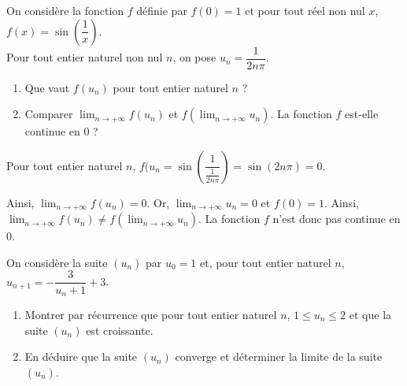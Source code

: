 \documentclass[11pt,fleqn, openany]{book} %
\begin{document}
\begin{exercise}On considère la fonction $f$ définie par $f(0)=1$ et pour tout réel non nul $x$, $f(x)=\sin\left(\dfrac{1}{x}\right)$. \\ Pour tout entier naturel non nul $n$, on pose $u_n=\dfrac{1}{2n\pi}$.
\begin{enumerate}
\item Que vaut $f(u_n)$ pour tout entier naturel $n$ ?
\item Comparer $\displaystyle\lim_{n \to +\infty}f(u_n)$ et $f(\displaystyle\lim_{n \to + \infty}u_n)$. La fonction $f$ est-elle continue en 0 ?\end{enumerate}\newpage
\end{exercise}


\begin{solution}Pour tout entier naturel $n$, $f(u_n=\sin\left(\dfrac{1}{\frac{1}{2n\pi}}\right)=\sin(2n\pi)=0$.

Ainsi, $\displaystyle\lim_{n \to + \infty}f(u_n)=0$. Or, $\displaystyle\lim_{n\to+\infty}u_n=0$ et $f(0)=1$. Ainsi, $\displaystyle\lim_{n \to +\infty}f(u_n)\neq f(\displaystyle\lim_{n\to+\infty}u_n)$. La fonction $f$ n'est donc pas continue en 0.\end{solution}





\begin{exercise}On considère la suite $(u_n)$ par $u_0=1$ et, pour tout entier naturel $n$, $u_{n+1}=-\dfrac{3}{u_n+1}+3$.
\begin{enumerate}
\item Montrer par récurrence que pour tout entier naturel $n$, $1\leqslant u_n\leqslant 2$ et que la suite $(u_n)$ est croissante.
\item En déduire que la suite $(u_n)$ converge et déterminer la limite de la suite $(u_n)$.
\end{enumerate}\end{exercise}
\end{document}

